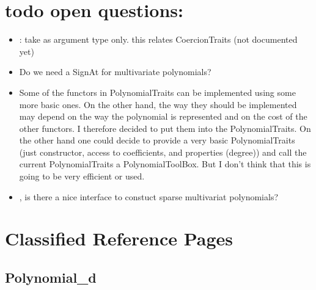 


\section{todo open questions:}

\begin{itemize} 
\item {}: take  as argument type only.
      this relates CoercionTraits (not documented yet) 
\item Do we need a SignAt for multivariate polynomials?
\item Some of the functors in PolynomialTraits can be implemented using some more basic ones. 
      On the other hand, the way they should be implemented may depend on  the way the polynomial is 
      represented and on the cost of the other functors. 
      I therefore decided to put them into the PolynomialTraits. 
      On the other hand one could decide to provide a very basic PolynomialTraits 
      (just constructor, access to coefficients, and properties (degree)) and call the current 
      PolynomialTraits a PolynomialToolBox. But I don't think that this is going to be very efficient 
      or used. 
\item {}, is there a nice interface to 
      constuct sparse multivariat polynomials?
\end{itemize}

\section{Classified Reference Pages}

\subsection*{Polynomial\_d} 

\\
\\

\\
\\
\\
\\
\\
\\

